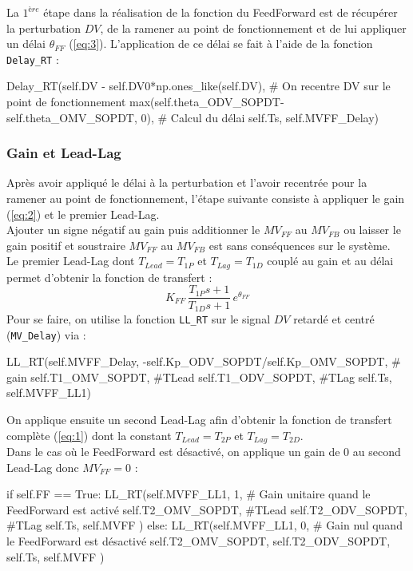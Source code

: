La $1^{ère}$ étape dans la réalisation de la fonction du FeedForward est de récupérer la perturbation $DV$, de la ramener au point de fonctionnement et de lui appliquer un délai $\theta_{FF}$ (\ref{eq:3}).
L'application de ce délai se fait à l'aide de la fonction \texttt{Delay\_RT} :
\begin{python*}
	Delay_RT(self.DV - self.DV0*np.ones_like(self.DV), # On recentre DV sur le point de fonctionnement
		max(self.theta_ODV_SOPDT-self.theta_OMV_SOPDT, 0), # Calcul du délai 
		self.Ts, 
		self.MVFF_Delay)
\end{python*}

\subsubsection{Gain et Lead-Lag}
Après avoir appliqué le délai à la perturbation et l'avoir recentrée pour la ramener au point de fonctionnement, l'étape suivante
consiste à appliquer le gain (\ref{eq:2}) et le premier Lead-Lag.
\\Ajouter un signe négatif au gain puis additionner le $MV_{FF}$ au $MV_{FB}$ ou laisser le gain positif et soustraire $MV_{FF}$ au $MV_{FB}$ est sans conséquences sur le système.
\\Le premier Lead-Lag dont $T_{Lead} = T_{1P}$ et $T_{Lag} = T_{1D}$ couplé au gain et au délai permet d'obtenir la fonction de transfert : 
\[K_{FF}\, \frac{T_{1P}s + 1}{T_{1D}s + 1} \, e^{\theta_{FF}}\]
Pour se faire, on utilise la fonction \texttt{LL\_RT} sur le signal $DV$ retardé et centré (\texttt{MV\_Delay}) via : 
\begin{python*}
	LL_RT(self.MVFF_Delay, 
		-self.Kp_ODV_SOPDT/self.Kp_OMV_SOPDT, # gain
		self.T1_OMV_SOPDT, #TLead
		self.T1_ODV_SOPDT, #TLag
		self.Ts, 
		self.MVFF_LL1)
\end{python*}
On applique ensuite un second Lead-Lag afin d'obtenir la fonction de transfert complète (\ref{eq:1}) dont la
constant $T_{Lead} = T_{2P}$ et $T_{Lag} = T_{2D}$.
\\Dans le cas où le FeedForward est désactivé, on applique un gain de 0 au second Lead-Lag donc $MV_{FF} = 0$ : 
\begin{python*}
	if self.FF == True:
		LL_RT(self.MVFF_LL1, 
			1, # Gain unitaire quand le FeedForward est activé
			self.T2_OMV_SOPDT, #TLead
			self.T2_ODV_SOPDT, #TLag
			self.Ts, 
			self.MVFF
		)
	else:
		LL_RT(self.MVFF_LL1, 
			0, # Gain nul quand le FeedForward est désactivé
			self.T2_OMV_SOPDT, 
			self.T2_ODV_SOPDT, 
			self.Ts, 
			self.MVFF
			) 
\end{python*}





